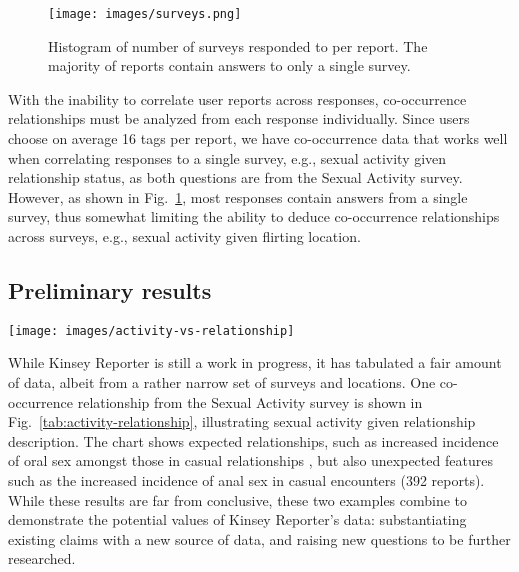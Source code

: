 \documentclass{sigchi}
\begin{document}
\begin{figure}
\texttt{[image: images/surveys.png]}
\caption{Histogram of number of surveys responded to per report. The majority of reports contain answers to only a single survey.}
\label{fig:hist-surveys}
\end{figure}

With the inability to correlate user reports across responses, co-occurrence relationships must be analyzed from each response individually. Since users choose on average 16 tags per report, we have co-occurrence data that works well when correlating responses to a single survey, e.g., sexual activity given relationship status, as both questions are from the Sexual Activity survey. However, as shown in Fig.~\ref{fig:hist-surveys}, most responses contain answers from a single survey, thus somewhat limiting the ability to deduce co-occurrence relationships across surveys, e.g., sexual activity given flirting location.

\subsection{Preliminary results}

\begin{figure*}
\texttt{[image: images/activity-vs-relationship]}
 \caption{Sexual activity given relationship description, based on
 5453
 reports containing answers to both questions. Responses can include more than one activity. This chart was created with the Explore tool at \protect\url{kinseyreporter.org/explore}. }
\label{tab:activity-relationship}
\end{figure*}

While Kinsey Reporter is still a work in progress, it has tabulated a fair amount of data, albeit from a rather narrow set of surveys and locations. One co-occurrence relationship from the Sexual Activity survey is shown in Fig.~\ref{tab:activity-relationship}, illustrating sexual activity given relationship description. The chart shows expected relationships, such as increased incidence of oral sex amongst those in casual relationships \cite{Reiber2010},  
but also unexpected features such as the increased incidence of anal sex in casual encounters (392 reports). While these results are far from conclusive, these two examples combine to demonstrate the potential values of Kinsey Reporter's data: substantiating existing claims with a new source of data, and raising new questions to be further researched.
\end{document}
